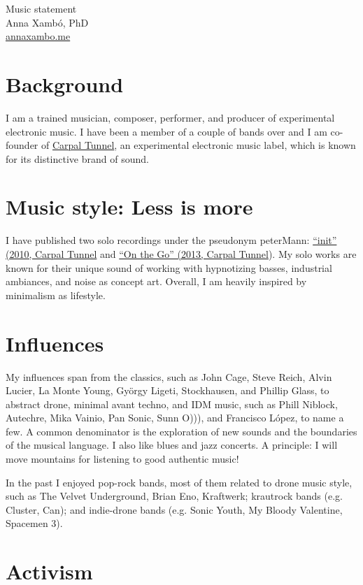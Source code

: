 \documentclass[10pt, a4paper]{article}
\begin{document}
{\LARGE Music statement}\\[0.2cm]
Anna Xambó, PhD\\
\href{http://annaxambo.me}{annaxambo.me}

\section*{Background}

I am a trained musician, composer, performer, and producer of experimental electronic music. I have been a member of a couple of bands over and I am co-founder of \href{http://carpaltunnel.cat}{Carpal Tunnel}, an experimental electronic music label, which is known for its distinctive brand of sound. 

\section*{Music style: Less is more}

I have published two solo recordings under the pseudonym peterMann: \href{http://carpaltunnel.cat/CT002.php}{``init'' (2010, Carpal Tunnel} and \href{http://carpaltunnel.cat/CT004.php}{ ``On the Go'' (2013, Carpal Tunnel}). My solo works are known for their unique sound of working with hypnotizing basses, industrial ambiances, and noise as concept art. Overall, I am heavily inspired by minimalism as lifestyle.

\section*{Influences}

My influences span from the classics, such as John Cage, Steve Reich, Alvin Lucier, La Monte Young, György Ligeti, Stockhausen, and Phillip Glass, to abstract drone, minimal avant techno, and IDM music, such as Phill Niblock, Autechre, Mika Vainio, Pan Sonic, Sunn O))), and Francisco López, to name a few. A common denominator is the exploration of new sounds and the boundaries of the musical language. I also like blues and jazz concerts. A principle: I will move mountains for listening to good authentic music! 

In the past I enjoyed pop-rock bands, most of them related to drone music style, such as The Velvet Underground, Brian Eno, Kraftwerk; krautrock bands (e.g. Cluster, Can); and indie-drone bands (e.g. Sonic Youth, My Bloody Valentine, Spacemen 3).

\section*{Activism}
\end{document}
